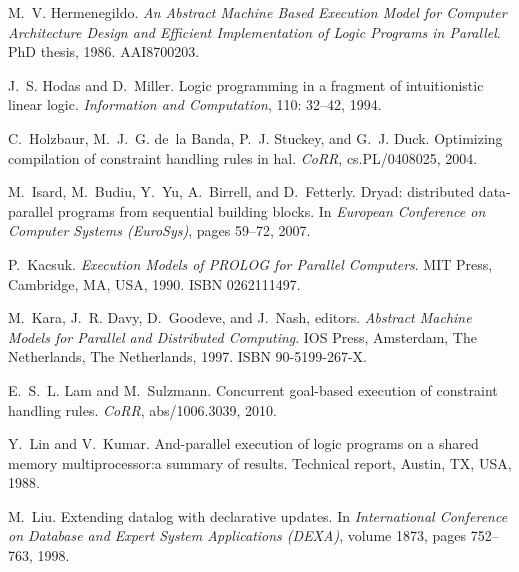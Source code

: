 \documentclass{sigplanconf}
\begin{document}
\begin{thebibliography}{35}
M.~V. Hermenegildo.
\newblock \emph{An Abstract Machine Based Execution Model for Computer
  Architecture Design and Efficient Implementation of Logic Programs in
  Parallel}.
\newblock PhD thesis, 1986.
\newblock AAI8700203.

J.~S. Hodas and D.~Miller.
\newblock Logic programming in a fragment of intuitionistic linear logic.
\newblock \emph{Information and Computation}, 110: 32--42, 1994.

C.~Holzbaur, M.~J.~G. de~la Banda, P.~J. Stuckey, and G.~J. Duck.
\newblock Optimizing compilation of constraint handling rules in hal.
\newblock \emph{CoRR}, cs.PL/0408025, 2004.

M.~Isard, M.~Budiu, Y.~Yu, A.~Birrell, and D.~Fetterly.
\newblock Dryad: distributed data-parallel programs from sequential building
  blocks.
\newblock In \emph{European Conference on Computer Systems (EuroSys)}, pages
  59--72, 2007.

P.~Kacsuk.
\newblock \emph{Execution Models of PROLOG for Parallel Computers}.
\newblock MIT Press, Cambridge, MA, USA, 1990.
\newblock ISBN 0262111497.

M.~Kara, J.~R. Davy, D.~Goodeve, and J.~Nash, editors.
\newblock \emph{Abstract Machine Models for Parallel and Distributed
  Computing}.
\newblock IOS Press, Amsterdam, The Netherlands, The Netherlands, 1997.
\newblock ISBN 90-5199-267-X.

E.~S.~L. Lam and M.~Sulzmann.
\newblock Concurrent goal-based execution of constraint handling rules.
\newblock \emph{CoRR}, abs/1006.3039, 2010.

Y.~Lin and V.~Kumar.
\newblock And-parallel execution of logic programs on a shared memory
  multiprocessor:a summary of results.
\newblock Technical report, Austin, TX, USA, 1988.

M.~Liu.
\newblock Extending datalog with declarative updates.
\newblock In \emph{International Conference on Database and Expert System
  Applications (DEXA)}, volume 1873, pages 752--763, 1998.


\end{thebibliography}
\end{document}
